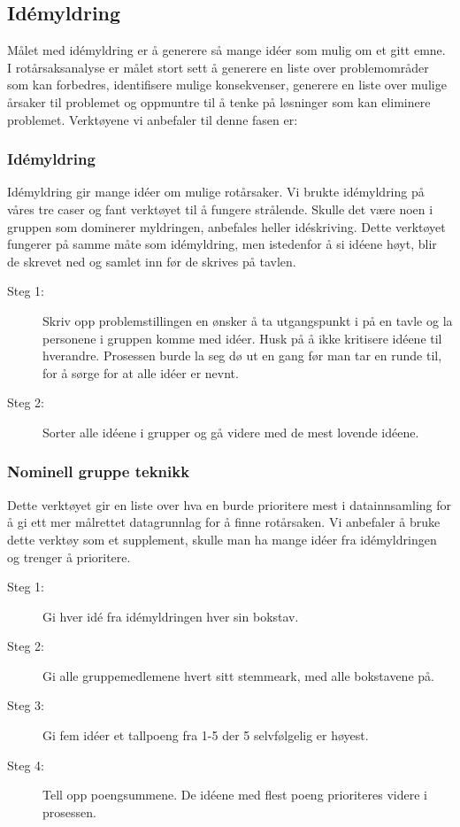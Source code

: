 %
\subsection{Idémyldring}
Målet med idémyldring er å generere så mange idéer som mulig om et gitt emne. I rotårsaksanalyse er målet stort sett å generere en liste over problemområder som kan forbedres, identifisere mulige konsekvenser, generere en liste over mulige årsaker til problemet og oppmuntre til å tenke på løsninger som kan eliminere problemet. Verktøyene vi anbefaler til denne fasen er:

\subsubsection{Idémyldring} Idémyldring gir mange idéer om mulige rotårsaker. Vi brukte idémyldring på våres tre caser og fant verktøyet til å fungere strålende. Skulle det være noen i gruppen som dominerer myldringen, anbefales heller idéskriving. Dette verktøyet fungerer på samme måte som idémyldring, men istedenfor å si idéene høyt, blir de skrevet ned og samlet inn før de skrives på tavlen. 

\begin{description}
    \item[Steg 1:] Skriv opp problemstillingen en ønsker å ta utgangspunkt i på en tavle og la personene i gruppen komme med idéer. Husk på å ikke kritisere idéene til hverandre. Prosessen burde la seg dø ut en gang før man tar en runde til, for å sørge for at alle idéer er nevnt. 
    \item[Steg 2:] Sorter alle idéene i grupper og gå videre med de mest lovende idéene.
\end{description}

\subsubsection{Nominell gruppe teknikk} 
Dette verktøyet gir en liste over hva en burde prioritere mest i datainnsamling for å gi ett mer målrettet datagrunnlag for å finne rotårsaken. Vi anbefaler å bruke dette verktøy som et supplement, skulle man ha mange idéer fra idémyldringen og trenger å prioritere.
\begin{description}
    \item[Steg 1:] Gi hver idé fra idémyldringen hver sin bokstav.
    \item[Steg 2:] Gi alle gruppemedlemene hvert sitt stemmeark, med alle bokstavene på. 
    \item[Steg 3:] Gi fem idéer et tallpoeng fra 1-5 der 5 selvfølgelig er høyest.
    \item[Steg 4:] Tell opp poengsummene. De idéene med flest poeng prioriteres videre i prosessen.
\end{description}


